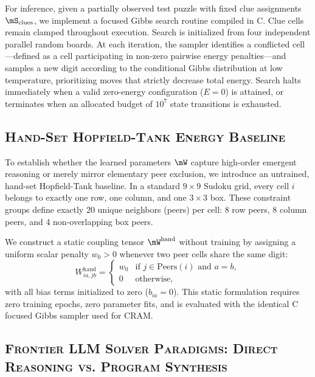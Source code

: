 \documentclass{article} %
\begin{document}
For inference, given a partially observed test puzzle with fixed clue assignments $\mS_{\mathrm{clues}}$, we implement a focused Gibbs search routine compiled in C. Clue cells remain clamped throughout execution. Search is initialized from four independent parallel random boards. At each iteration, the sampler identifies a conflicted cell—defined as a cell participating in non-zero pairwise energy penalties—and samples a new digit according to the conditional Gibbs distribution at low temperature, prioritizing moves that strictly decrease total energy. Search halts immediately when a valid zero-energy configuration ($E = 0$) is attained, or terminates when an allocated budget of $10^7$ state transitions is exhausted.

\subsection{\textsc{Hand-Set Hopfield-Tank Energy Baseline}}
\label{subsec:handset_baseline}

To establish whether the learned parameters $\mW$ capture high-order emergent reasoning or merely mirror elementary peer exclusion, we introduce an untrained, hand-set Hopfield-Tank baseline. In a standard $9 \times 9$ Sudoku grid, every cell $i$ belongs to exactly one row, one column, and one $3 \times 3$ box. These constraint groups define exactly 20 unique neighbors (peers) per cell: 8 row peers, 8 column peers, and 4 non-overlapping box peers.

We construct a static coupling tensor $\mW^{\mathrm{hand}}$ without training by assigning a uniform scalar penalty $w_0 > 0$ whenever two peer cells share the same digit:
\begin{equation}
    W_{ia, jb}^{\mathrm{hand}} = 
    \begin{cases} 
        w_0 & \text{if } j \in \mathrm{Peers}(i) \text{ and } a = b, \\
        0 & \text{otherwise,}
    \end{cases}
    \label{eq:handset_energy}
\end{equation}
with all bias terms initialized to zero ($b_{ia} = 0$). This static formulation requires zero training epochs, zero parameter fits, and is evaluated with the identical C focused Gibbs sampler used for CRAM.

\subsection{\textsc{Frontier LLM Solver Paradigms: Direct Reasoning vs. Program Synthesis}}
\label{subsec:llm_solver_paradigms}
\end{document}
